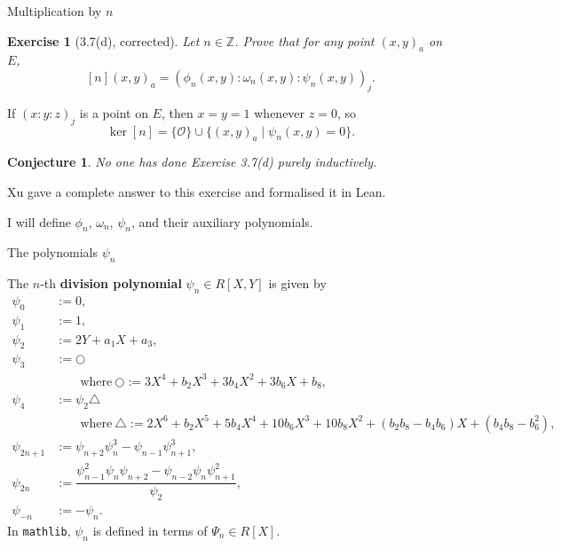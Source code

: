 \documentclass[10pt]{beamer}
\newtheorem{conjecture}{Conjecture}
\newtheorem{exercise}{Exercise}
\begin{document}
\begin{frame}[t]{Multiplication by $ n $}

\begin{exercise}[3.7(d), corrected]
Let $ n \in \mathbb{Z} $. Prove that for any point $ (x, y)_a $ on $ E $,
$$ [n](x, y)_a = (\phi_n(x, y) : \omega_n(x, y) : \psi_n(x, y))_j. $$
\end{exercise}

\pause

If $ (x : y : z)_j $ is a point on $ E $, then $ x = y = 1 $ whenever $ z = 0 $, so
$$ \ker[n] = \{\mathcal{O}\} \cup \{(x, y)_a \mid \psi_n(x, y) = 0\}. $$

\pause

\begin{conjecture}
No one has done Exercise 3.7(d) purely inductively.
\end{conjecture}

\pause

\vspace{0.5cm} Xu gave a complete answer to this exercise and formalised it in Lean.

\vspace{0.5cm} I will define $ \phi_n $, $ \omega_n $, $ \psi_n $, and their auxiliary polynomials.

\end{frame}

\begin{frame}[t]{The polynomials $ \psi_n $}

The $ n $-th \textbf{division polynomial} $ \psi_n \in R[X, Y] $ is given by
\begin{align*}
\psi_0 & := 0, \\
\psi_1 & := 1, \\
\psi_2 & := 2Y + a_1X + a_3, \\
\psi_3 & := \bigcirc \\
& \qquad \text{where} \ \bigcirc := 3X^4 + b_2X^3 + 3b_4X^2 + 3b_6X + b_8, \\
\psi_4 & := \psi_2\triangle \\
& \qquad \text{where} \ \triangle := {\scriptscriptstyle 2X^6 + b_2X^5 + 5b_4X^4 + 10b_6X^3 + 10b_8X^2 + (b_2b_8 - b_4b_6)X + (b_4b_8 - b_6^2)}, \\
\psi_{2n + 1} & := \psi_{n + 2}\psi_n^3 - \psi_{n - 1}\psi_{n + 1}^3, \\
\psi_{2n} & := \dfrac{\psi_{n - 1}^2\psi_n\psi_{n + 2} - \psi_{n - 2}\psi_n\psi_{n + 1}^2}{\psi_2}, \\
\psi_{-n} & := -\psi_n.
\end{align*}
In \texttt{mathlib}, $ \psi_n $ is defined in terms of $ \Psi_n \in R[X] $.

\end{frame}
\end{document}
